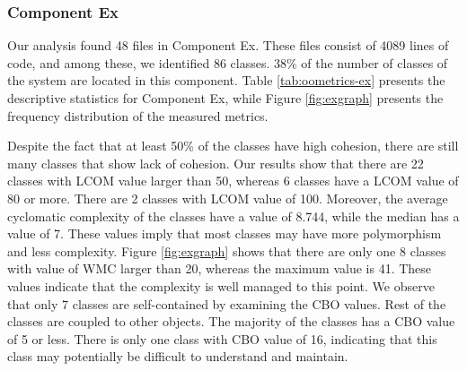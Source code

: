 \subsubsection{Component Ex}
Our analysis found 48 files in Component Ex. These files consist of 4089 lines of code, and among these, we identified 86 classes. 38\% of the number of classes of the system are located in this component. Table \ref{tab:oometrics-ex} presents the descriptive statistics for Component Ex, while Figure \ref{fig:exgraph} presents the frequency distribution of the measured metrics. 

Despite the fact that at least 50\% of the classes have high cohesion, there are still many classes that show lack of cohesion. Our results show that there are 22 classes with LCOM value larger than 50, whereas 6 classes have a LCOM value of 80 or more. There are 2 classes with LCOM value of 100. Moreover, the average cyclomatic complexity of the classes have a value of 8.744, while the median has a value of 7. These values imply that most classes may have more polymorphism and less complexity. Figure \ref{fig:exgraph} shows that there are only one 8 classes with value of WMC larger than 20, whereas the maximum value is 41. These values indicate that the complexity is well managed to this point. We observe that only 7 classes are self-contained by examining the CBO values. Rest of the classes are coupled to other objects. The majority of the classes has a CBO value of 5 or less. There is only one class with CBO value of 16, indicating that this class may potentially be difficult to understand and maintain. 


